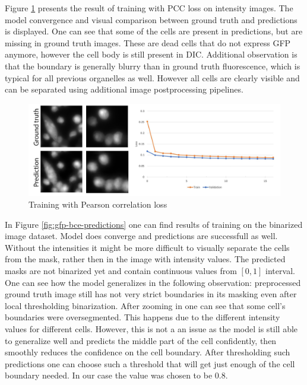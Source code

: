 Figure \ref{fig:gfp-pcc-predictions} presents the result of training with PCC loss on intensity images. The model convergence and visual comparison between ground truth and predictions is displayed. One can see that some of the cells are present in predictions, but are missing in ground truth images. These are dead cells that do not express GFP anymore, however the cell body is still present in DIC. Additional observation is that the boundary is generally blurry than in ground truth fluorescence, which is typical for all previous organelles as well. However all cells are clearly visible and can be separated using additional image postprocessing pipelines.
\begin{figure}[H]
	\begin{center}
		\includegraphics[width=0.6\linewidth]{bilder/gfp/predictions.png}
		\caption{Training with Pearson correlation loss}\label{fig:gfp-pcc-predictions}
	\end{center}
\end{figure}

In Figure \ref{fig:gfp-bce-predictions} one can find results of training on the binarized image dataset. Model does converge and predictions are successfull as well. Without the intensities it might be more difficult to visually separate the cells from the mask, rather then in the image with intensity values. The predicted masks are not binarized yet and contain continuous values from $[0, 1]$ interval. One can see how the model generalizes in the following observation: preprocessed ground truth image still has not very strict boundaries in its masking even after local thresholding binarization. After zooming in one can see that some cell's boundaries were oversegmented. This happens due to the different intensity values for different cells. However, this is not a an issue as the model is still able to generalize well and predicts the middle part of the cell confidently, then smoothly reduces the confidence on the cell boundary. After thresholding such predictions one can choose such a threshold that will get just enough of the cell boundary needed. In our case the value was chosen to be $0.8$.

